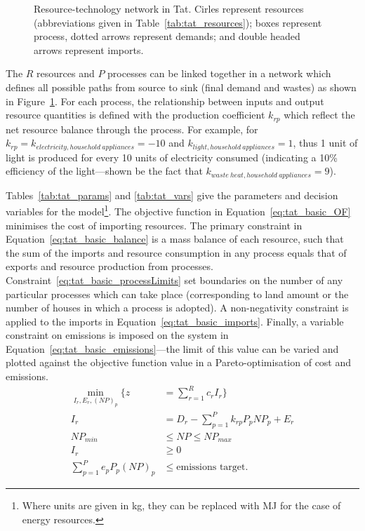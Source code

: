 \begin{figure}[h]
	\centering
	
	\caption{Resource-technology network in Tat. Cirles represent resources (abbreviations given in Table~\ref{tab:tat_resources}); boxes represent process, dotted arrows represent demands; and double headed arrows represent imports.} \label{fig:tat_network}
\end{figure}

 

The $R$ resources and $P$ processes can be linked together in a network which defines all possible paths from source to sink (final demand and wastes) as shown in Figure~\ref{fig:tat_network}. For each process, the relationship between inputs and output resource quantities is defined with the production coefficient $k_{rp}$ which reflect the net resource balance through the process. For example, for $k_{rp}=k_{electricity, household~appliances}=-10$ and $k_{light, household~appliances}=1$, thus 1 unit of light is produced for every 10 units of electricity consumed (indicating a 10\% efficiency of the light---shown be the fact that $k_{waste~heat, household~appliances}=9$).

Tables~\ref{tab:tat_params} and \ref{tab:tat_vars} give the parameters and decision variables for the model\footnote{Where units are given in kg, they can be replaced with MJ for the case of energy resources.}. The objective function in Equation~\eqref{eq:tat_basic_OF} minimises the cost of importing resources. The primary constraint in Equation~\eqref{eq:tat_basic_balance} is a mass balance of each resource, such that the sum of the imports and resource consumption in any process equals that of exports and resource production from processes. Constraint~\eqref{eq:tat_basic_processLimits} set boundaries on the number of any particular processes which can take place (corresponding to land amount or the number of houses in which a process is adopted). A non-negativity constraint is applied to the imports in Equation~\eqref{eq:tat_basic_imports}. Finally, a variable constraint on emissions is imposed on the system in Equation~\eqref{eq:tat_basic_emissions}---the limit of this value can be varied and plotted against the objective function value in a Pareto-optimisation of cost and emissions.
\begin{align}
	\min_{I_r,E_r,(NP)_p} \Bigg\{z&=\sum_{r=1}^R c_rI_{r} \Bigg\} \label{eq:tat_basic_OF} \\
	I_r&=D_r-\sum_{p=1}^{P}k_{rp} P_p NP_p + E_r \label{eq:tat_basic_balance} \\
	NP_{min} &\leq NP \leq NP_{max} \label{eq:tat_basic_processLimits} \\			
	I_r &\geq 0 \label{eq:tat_basic_imports} \\
	\sum_{p=1}^P e_p P_p (NP)_p &\leq \mbox{emissions target} \label{eq:tat_basic_emissions}.
\end{align}
 
 

